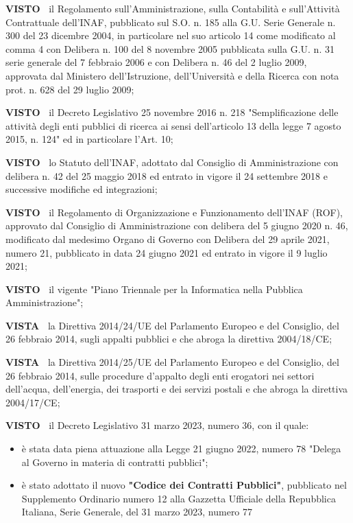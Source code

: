\textbf{VISTO~}	il Regolamento sull’Amministrazione, sulla Contabilità
e sull’Attività Contrattuale dell’INAF, pubblicato sul S.O. n. 185
alla G.U. Serie Generale n. 300 del 23 dicembre 2004, in particolare
nel suo articolo 14 come modificato al comma 4 con Delibera n. 100
del 8 novembre 2005 pubblicata sulla G.U. n. 31 serie generale del
7 febbraio 2006 e con Delibera n. 46 del 2 luglio 2009, approvata dal
Ministero dell’Istruzione, dell’Università e della Ricerca con nota
prot. n. 628 del 29 luglio 2009;

\textbf{VISTO~}	il Decreto Legislativo 25 novembre 2016 n. 218
"Semplificazione delle attività degli enti pubblici di ricerca ai
sensi dell’articolo 13 della legge 7 agosto 2015, n. 124" ed in
particolare l’Art. 10;

\textbf{VISTO~}	lo Statuto dell’INAF, adottato dal Consiglio di
Amministrazione con delibera n. 42 del 25 maggio 2018 ed entrato in
vigore il 24 settembre 2018 e successive modifiche ed integrazioni;

\textbf{VISTO~}	 il Regolamento di Organizzazione e Funzionamento
dell’INAF (ROF), approvato dal Consiglio di Amministrazione con delibera
del 5 giugno 2020 n. 46, modificato dal medesimo Organo di Governo con
Delibera del 29 aprile 2021, numero 21, pubblicato in data 24 giugno
2021 ed entrato in vigore il 9 luglio 2021;

\textbf{VISTO~}	il vigente "Piano Triennale per la Informatica nella Pubblica
Amministrazione";

\textbf{VISTA~}	la Direttiva 2014/24/UE del Parlamento Europeo e del
Consiglio, del 26 febbraio 2014, sugli appalti pubblici e che abroga la
direttiva 2004/18/CE;  

\textbf{VISTA~}	la Direttiva 2014/25/UE del Parlamento Europeo e del
Consiglio, del 26 febbraio 2014, sulle procedure d'appalto degli enti
erogatori nei settori dell'acqua, dell'energia, dei trasporti e dei
servizi postali e che abroga la direttiva 2004/17/CE; 

\textbf{VISTO~}	il Decreto Legislativo 31 marzo 2023, numero 36, con il
quale:
\begin{itemize}

\item  è stata data piena attuazione alla Legge 21 giugno 2022,
numero 78 "Delega al Governo in materia di contratti pubblici";

\item è stato adottato il nuovo \textbf{"Codice dei Contratti Pubblici"},
    pubblicato nel Supplemento Ordinario numero 12 alla Gazzetta Ufficiale
    della Repubblica Italiana, Serie Generale, del 31 marzo 2023, numero 77
\end{itemize}

